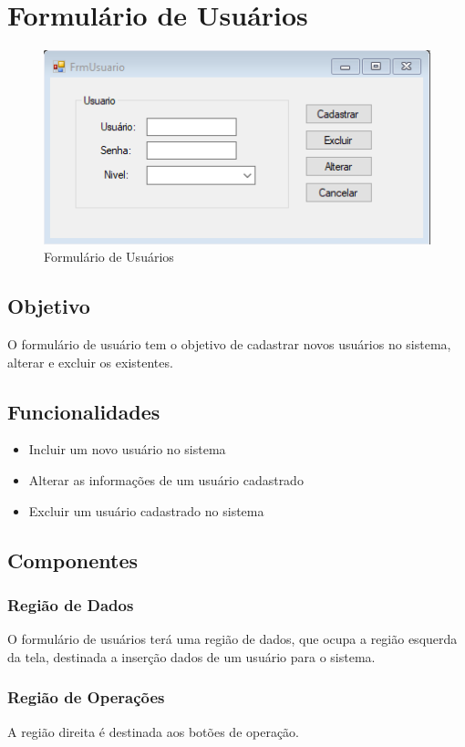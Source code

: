 \documentclass[
	article,			%
	12pt,				%
	oneside,			%
	a4paper,			%
	english,			%
	brazil,				%
	sumario=tradicional
	]{abntex2}
\begin{document}
\newpage
	\section{Formulário de Usuários}
	\begin{figure}[!htb]
		\centering
		\includegraphics[scale=1.3]{../Figuras/FrmUsuario.png}
		\caption{Formulário de Usuários}
	\end{figure}
\subsection{Objetivo}
O formulário de usuário tem o objetivo de cadastrar novos usuários no sistema, alterar e excluir os existentes.
\subsection{Funcionalidades}
\begin{itemize}
	\item Incluir um novo usuário no sistema
	\item Alterar as informações de um usuário cadastrado
	\item Excluir um usuário cadastrado no sistema
\end{itemize}
\subsection{Componentes}

\subsubsection{Região de Dados}
O formulário de usuários terá uma região de dados, que ocupa a região esquerda da tela, destinada a inserção dados de um usuário para o sistema.
\subsubsection{Região de Operações}
A região direita é destinada aos botões de operação.
\newpage
\end{document}
